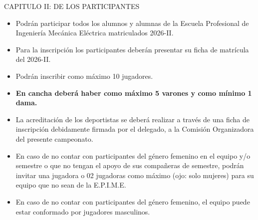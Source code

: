 \documentclass[11pt,a4paper]{article}
\newcommand{\capitulo}[1]{\par\medskip #1\par}
\begin{document}
\capitulo{CAPITULO II: DE LOS PARTICIPANTES}
\begin{itemize}
	\item Podrán participar todos los alumnos y alumnas de la Escuela Profesional de Ingeniería Mecánica Eléctrica matriculados 2026-II.
	\item Para la inscripción los participantes deberán presentar su ficha de matrícula del 2026-II.
	\item Podrán inscribir como máximo 10 jugadores.
	\item \textbf{En cancha deberá haber como máximo 5 varones y como mínimo 1 dama.}
	\item La acreditación de los deportistas se deberá realizar a través de una ficha de inscripción debidamente firmada por el delegado, a la Comisión Organizadora del presente campeonato.
	\item En caso de no contar con participantes del género femenino en el equipo y/o semestre o que no tengan el apoyo de sus compañeras de semestre, podrán invitar una jugadora o 02 jugadoras como máximo (ojo: solo mujeres) para su equipo que no sean de la E.P.I.M.E.
	\item En caso de no contar con participantes del género femenino, el equipo puede estar conformado por jugadores masculinos.
\end{itemize}
\end{document}
